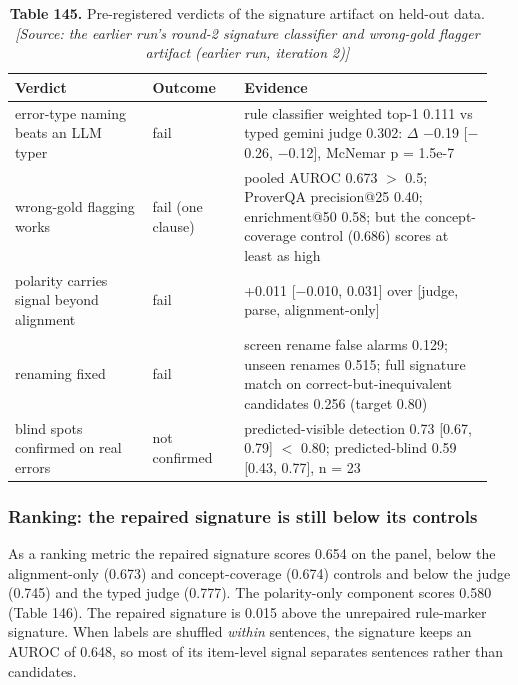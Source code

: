 \documentclass[11pt,letterpaper]{article}
\begin{document}
\begin{table}[H]
\centering
\small
\setlength{\tabcolsep}{3pt}
\caption*{\textbf{Table 145.} Pre-registered verdicts of the signature artifact on held-out data. \textit{[Source: the earlier run's round-2 signature classifier and wrong-gold flagger artifact (earlier run, iteration 2)]}}
\begin{tabular}{>{\raggedright\arraybackslash}p{0.273\linewidth}>{\raggedright\arraybackslash}p{0.181\linewidth}>{\raggedright\arraybackslash}p{0.498\linewidth}}
\toprule
\textbf{Verdict} & \textbf{Outcome} & \textbf{Evidence} \\
\midrule
{}error-type naming beats an LLM typer & fail & rule classifier weighted top-1 0.111 vs typed gemini judge 0.302: $\Delta$ $-$0.19 [$-$0.26, $-$0.12], McNemar p = 1.5e-7 \\
{}wrong-gold flagging works & fail (one clause) & pooled AUROC 0.673 $>$ 0.5; ProverQA precision@25 0.40; enrichment@50 0.58; but the concept-coverage control (0.686) scores at least as high \\
{}polarity carries signal beyond alignment & fail & +0.011 [$-$0.010, 0.031] over [judge, parse, alignment-only] \\
{}renaming fixed & fail & screen rename false alarms 0.129; unseen renames 0.515; full signature match on correct-but-inequivalent candidates 0.256 (target 0.80) \\
{}blind spots confirmed on real errors & not confirmed & predicted-visible detection 0.73 [0.67, 0.79] $<$ 0.80; predicted-blind 0.59 [0.43, 0.77], n = 23 \\
\bottomrule
\end{tabular}
\end{table}

\subsubsection{Ranking: the repaired signature is still below its controls}

As a ranking metric the repaired signature scores 0.654 on the panel, below the alignment-only (0.673) and concept-coverage (0.674) controls and below the judge (0.745) and the typed judge (0.777). The polarity-only component scores 0.580 (Table 146). The repaired signature is 0.015 above the unrepaired rule-marker signature. When labels are shuffled \emph{within} sentences, the signature keeps an AUROC of 0.648, so most of its item-level signal separates sentences rather than candidates.
\end{document}
